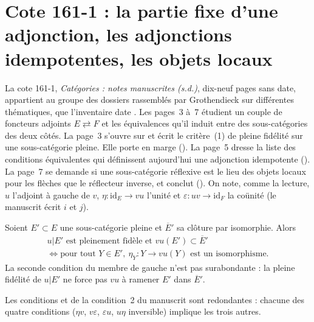 \section[Cote 161-1 : la partie fixe d'une adjonction, les adjonctions idempotentes, les objets locaux]{Cote 161-1 : la partie fixe d'une adjonction, les adjonctions idempotentes, les objets locaux\protect{}}\label{sec:161-1}

La cote 161-1, \emph{Catégories : notes manuscrites (s.d.)}, dix-neuf pages sans date, appartient au groupe des dossiers rassemblés par Grothendieck sur différentes thématiques, que l'inventaire date . Les pages~3 à~7 étudient un couple de foncteurs adjoints $E \rightleftarrows F$ et les équivalences qu'il induit entre des sous-catégories des deux côtés. La page~3 s'ouvre sur  et écrit le critère~(1) de pleine fidélité sur une sous-catégorie pleine. Elle porte en marge  (). La page~5 dresse la liste des conditions équivalentes qui définissent aujourd'hui une adjonction idempotente (). La page~7 se demande si une sous-catégorie réflexive est le lieu des objets locaux pour les flèches que le réflecteur inverse, et conclut  (). On note, comme la lecture, $u$ l'adjoint à gauche de $v$, $\eta : \mathrm{id}_E \to vu$ l'unité et $\varepsilon : uv \to \mathrm{id}_F$ la coünité (le manuscrit écrit $i$ et $j$).

\begin{enonce}[(1), page 3]
Soient $E' \subset E$ une sous-catégorie pleine et $\overline{E}'$ sa clôture par isomorphie. Alors
\[
  \begin{gathered}
  u|E' \text{ est pleinement fidèle et } vu(E') \subset \overline{E}' \\
  \iff \text{pour tout } Y \in E',\ \eta_Y : Y \to vu(Y) \text{ est un isomorphisme.}
  \end{gathered}
\]
La seconde condition du membre de gauche n'est pas surabondante : la pleine fidélité de $u|E'$ ne force pas $vu$ à ramener $E'$ dans $\overline{E}'$.
\end{enonce}

\begin{enonce}
Les conditions  et  de la condition~2 du manuscrit sont redondantes : chacune des quatre conditions ($\eta v$, $v\varepsilon$, $\varepsilon u$, $u\eta$ inversible) implique les trois autres.
\end{enonce}

